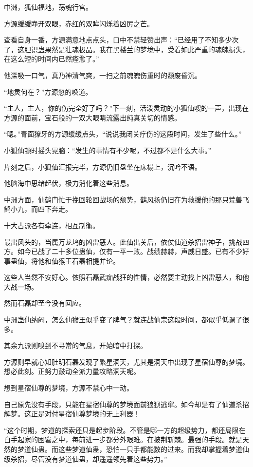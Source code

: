 
\begin{this_body}



中洲，狐仙福地，荡魂行宫。

方源缓缓睁开双眼，赤红的双眸闪烁着凶厉之芒。

查看自身一番，方源满意地点点头，口中不禁轻赞出声：“已经用了不知多少次了，这胆识蛊果然是壮魂极品。我在黑楼兰的梦境中，受着如此严重的魂魄损失，在这么短的时间内已然痊愈了。”

他深吸一口气，真乃神清气爽，一扫之前魂魄伤重时的颓废昏沉。

“地灵何在？”方源忽的唤道。

“主人，主人，你的伤完全好了吗？”下一刻，活泼灵动的小狐仙嗖的一声，出现在方源的面前，宝石般的一双大眼睛流露出纯真关切的情感。

“嗯。”青面獠牙的方源缓缓点头，“说说我闭关疗伤的这段时间，发生了些什么。”

小狐仙顿时摇头晃脑：“发生的事情有不少呢，不过都不是什么大事。”

片刻之后，小狐仙汇报完毕，方源仍旧盘坐在床榻上，沉吟不语。

他脑海中思绪起伏，极力消化着这些消息。

中洲方面，仙鹤门忙于挽回轮回战场的颓势，鹤风扬仍旧在为救援他的那只荒兽飞鹤小九，而四下奔走。

十大古派各有牵连，相互制衡。

最出风头的，当属万龙坞的凶雷恶人。此仙出关后，依仗仙道杀招雷神子，挑战四方。如今已战了二十多位蛊仙，仅有一平一败。战绩赫赫，声威日盛。已有不少好事蛊仙，将他和仙猴王石磊相提并论。

这些人当然不安好心。依照石磊武痴战狂的性情，必然要主动找上凶雷恶人，和他大战一场。

然而石磊却至今没有回应。

中洲蛊仙纳闷，怎么仙猴王似乎变了脾气？就连战仙宗这段时间，都似乎低调了很多。

其余九派则嗅到不寻常的气息，开始暗中打探。

方源则早就心知肚明石磊发现了繁星洞天，尤其是洞天中出现了星宿仙尊的梦境。想必此刻。正努力鼓动全派力量攻略洞天呢。

想到星宿仙尊的梦境，方源不禁心中一动。

自己原先没有手段，只能在星宿仙尊的梦境面前狼狈逃窜。如今却是有了仙道杀招解梦。这正是对付星宿仙尊梦境的无上利器！

“这个时期，梦道的探索还只是起步阶段。不管是哪一方的超级势力，都还局限在白手起家的困窘之中，每前进一步都分外艰难。在披荆斩棘。最强的手段。就是天然的梦道仙蛊。而这些梦道仙蛊，恐怕一只手都能数的过来。而我却掌握着梦道仙级杀招，尽管没有梦道仙蛊，却遥遥领先着这些势力。”


\end{this_body}
